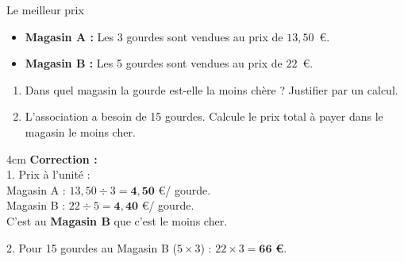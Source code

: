 \documentclass[a4paper]{book}
\begin{document}
{%
    \begin{exerciceTitre}{Le meilleur prix}
        \begin{itemize}
            \item \textbf{Magasin A :} Les 3 gourdes sont vendues au prix de $13,50$~\euro.
            \item \textbf{Magasin B :} Les 5 gourdes sont vendues au prix de $22$~\euro.
        \end{itemize}
        \begin{enumerate}
            \item Dans quel magasin la gourde est-elle la moins chère ? Justifier par un calcul.
            \item L'association a besoin de 15 gourdes. Calcule le prix total à payer dans le magasin le moins cher.
        \end{enumerate}
    
        \begin{ZoneReponse}{4cm}
            \textbf{Correction :} \\
            1. Prix à l'unité : \\
            Magasin A : $13,50 \div 3 = \mathbf{4,50}$ \euro / gourde. \\
            Magasin B : $22 \div 5 = \mathbf{4,40}$ \euro / gourde. \\
            C'est au \textbf{Magasin B} que c'est le moins cher. 

            \medskip
            
            2. Pour 15 gourdes au Magasin B ($5 \times 3$) : $22 \times 3 = \mathbf{66}$ \textbf{\euro}.
        \end{ZoneReponse}
    \end{exerciceTitre}
}
\end{document}
